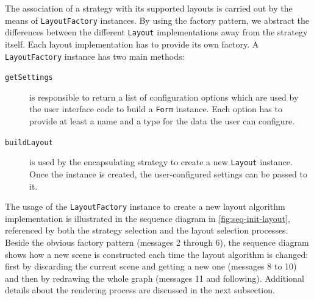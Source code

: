 The association of a strategy with its supported layouts is carried out by the means of \texttt{Layout\BreakableSlash{}Factory} instances. By using the factory pattern, we abstract the differences between the different \texttt{Layout} implementations away from the strategy itself. Each layout implementation has to provide its own factory. A \texttt{LayoutFactory} instance has two main methods:

\begin{description}
  \item[\texttt{getSettings}] is responsible to return a list of configuration options which are used by the user interface code to build a \texttt{Form} instance. Each option has to provide at least a name and a type for the data the user can configure.
  \item[\texttt{buildLayout}] is used by the encapsulating strategy to create a new \texttt{Layout} instance. Once the instance is created, the user-configured settings can be passed to it.
\end{description}

The usage of the \texttt{LayoutFactory} instance to create a new layout algorithm implementation is illustrated in the sequence diagram in \vref{fig:seq-init-layout}, referenced by both the strategy selection and the layout selection processes. Beside the obvious factory pattern (messages 2 through 6), the sequence diagram shows how a new scene is constructed each time the layout algorithm is changed: first by discarding the current scene and getting a new one (messages 8 to 10) and then by redrawing the whole graph (messages 11 and following). Additional details about the rendering process are discussed in the next subsection.

